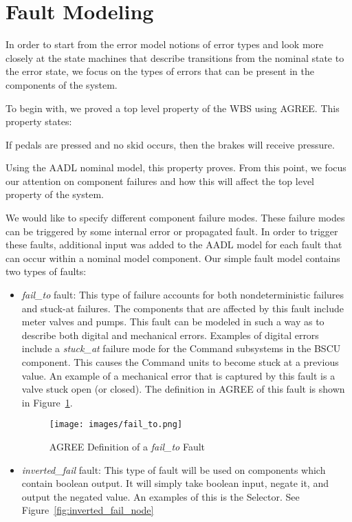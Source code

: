 \section{Fault Modeling}

In order to start from the error model notions of error types and look more closely at the state machines that describe transitions from the nominal state to the error state, we focus on the types of errors that can be present in the components of the system. 

To begin with, we proved a top level property of the WBS using AGREE. This property states: \\

\begin{tt}
If pedals are pressed and no skid occurs, then the brakes will receive pressure. \\
\end{tt}

Using the AADL nominal model, this property proves. From this point, we focus our attention on component failures and how this will affect the top level property of the system. 

We would like to specify different component failure modes. These failure modes can be triggered by some internal error or propagated fault. In order to trigger these faults, additional input was added to the AADL model for each fault that can occur within a nominal model component. Our simple fault model contains two types of faults:

\begin{itemize}
\item \textit{fail\_to} fault: This type of failure accounts for both nondeterministic failures and stuck-at failures. The components that are affected by this fault include meter valves and pumps. This fault can be modeled in such a way as to describe both digital and mechanical errors. Examples of digital errors include a \textit{stuck\_at} failure mode for the Command subsystems in the BSCU component. This causes the Command units to become stuck at a previous value. An example of a mechanical error that is captured by this fault is a valve stuck open (or closed). The definition in AGREE of this fault is shown in Figure~\ref{fig:fail_to_node}.\\

\begin{figure}[h!]
  \centering
 \texttt{[image: images/fail\_to.png]}
  \vspace{-0.1in}
  \caption{AGREE Definition of a \textit{fail\_to} Fault}
  \label{fig:fail_to_node}
\end{figure}


\item \textit{inverted\_fail} fault: This type of fault will be used on components which contain boolean output. It will simply take boolean input, negate it, and output the negated value. An examples of this is the Selector. See Figure~\ref{fig:inverted_fail_node}

\end{itemize}


